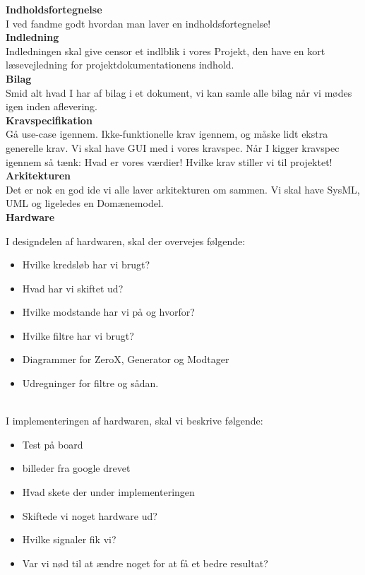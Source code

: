 \documentclass[11pt]{article}
\begin{document}
\textbf{Indholdsfortegnelse}
\\
I ved fandme godt hvordan man laver en indholdsfortegnelse!
\\

\textbf{Indledning}
\\
Indledningen skal give censor et indlblik i vores Projekt, den have en kort læsevejledning for projektdokumentationens indhold. \\

\textbf{Bilag}\\
Smid alt hvad I har af bilag i et dokument, vi kan samle alle bilag når vi mødes igen inden aflevering.\\

\textbf{Kravspecifikation}\\
Gå use-case igennem. Ikke-funktionelle krav igennem, og måske lidt ekstra generelle krav. Vi skal have GUI med i vores kravspec. Når I kigger kravspec igennem så tænk: Hvad er vores værdier! Hvilke krav stiller vi til projektet!\\

\textbf{Arkitekturen}\\
Det er nok en god ide vi alle laver arkitekturen om sammen. Vi skal have SysML, UML og ligeledes en Domænemodel.\\

\textbf{Hardware}


I designdelen af hardwaren, skal der overvejes følgende:

\begin{itemize}
	\item Hvilke kredsløb har vi brugt? 
	\item Hvad har vi skiftet ud?
	\item Hvilke modstande har vi på og hvorfor?
	\item Hvilke filtre har vi brugt? 
	\item Diagrammer for ZeroX, Generator og Modtager
	\item Udregninger for filtre og sådan.
\end{itemize}

\\
I implementeringen af hardwaren, skal vi beskrive følgende:

\begin{itemize}
	\item Test på board
	\item billeder fra google drevet
	\item Hvad skete der under implementeringen
	\item Skiftede vi noget hardware ud?
	\item Hvilke signaler fik vi?
	\item Var vi nød til at ændre noget for at få et bedre resultat?
\end{itemize}
\end{document}
